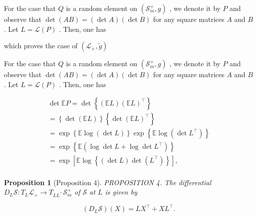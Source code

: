 \documentclass[11pt]{article}
\newtheorem{proposition}{Proposition}
\begin{document}
For the case that  $Q$  is a random element on  $(\mathcal{S}_m^+, g)$ , we denote it by  $P$  and observe that  $\operatorname{det}(AB) = (\operatorname{det} A)(\operatorname{det} B)$  for any square matrices  $A$  and  $B$ . Let  $L = \mathcal{L}(P)$ . Then, one has

which proves the case of  $(\mathcal{L}_{+},\tilde{g})$

For the case that  $Q$  is a random element on  $(\mathcal{S}_m^+, g)$ , we denote it by  $P$  and observe that  $\operatorname{det}(AB) = (\operatorname{det} A)(\operatorname{det} B)$  for any square matrices  $A$  and  $B$ . Let  $L = \mathcal{L}(P)$ . Then, one has

$$
\begin{array}{l} \det  \mathbb {E} P = \det  \left\{\left(\mathbb {E} L\right) \left(\mathbb {E} L\right) ^ {\top} \right\} \\ = \left\{\det  (\mathbb {E} L) \right\} \left\{\det  (\mathbb {E} L) ^ {\top} \right\} \\ = \exp \left\{\mathbb {E} \log (\det  L) \right\} \exp \left\{\mathbb {E} \log (\det  L ^ {\top}) \right\} \\ = \exp \left\{\mathbb {E} \left(\log \det  L + \log \det  L ^ {\top}\right) \right\} \\ = \exp \left[ \mathbb {E} \log \left\{\left(\det  L\right) \det  \left(L ^ {\top}\right) \right\} \right], \\ \end{array}
$$


\begin{proposition}[Proposition 4]
PROPOSITION 4. The differential  $D_L\mathcal{S}:T_L\mathcal{L}_+ \to T_{LL^\top}\mathcal{S}_m^+$  of  $\mathcal{S}$  at  $L$  is given by

$$
\left(D _ {L} \mathcal {S}\right) (X) = L X ^ {\top} + X L ^ {\top}.
$$
\end{proposition}
\end{document}
